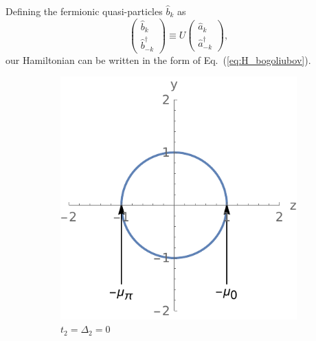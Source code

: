 \documentclass[a4paper]{article}
\newcommand{\C}{\hat{a}^{\dagger}}
\newcommand{\D}{\hat{a}}
\newcommand{\Cb}{\hat{b}^{\dagger}}
\newcommand{\Db}{\hat{b}}
\begin{document}
Defining the fermionic quasi-particles $\Db_k$ as
\begin{equation}
	\left(\begin{matrix}
		\Db_k \\
		\Cb_{-k}
	\end{matrix}\right)
	\equiv U
	\left(\begin{matrix}
		\D_k \\
		\C_{-k}
	\end{matrix}\right),
\end{equation}
our Hamiltonian can be written in the form of Eq.~(\ref{eq:H_bogoliubov}).

\begin{figure}
	\centering
	\begin{subfigure}{0.32\textwidth}
		\centering
		\includegraphics[width=\textwidth]{Figures/r_curve_1.pdf}
		\caption{$t_2 = \Delta_2 = 0$}
		\label{sfig:curve_1}
	\end{subfigure}
	\begin{subfigure}{0.32\textwidth}
		\centering

\end{subfigure}
\end{figure}
\end{document}
